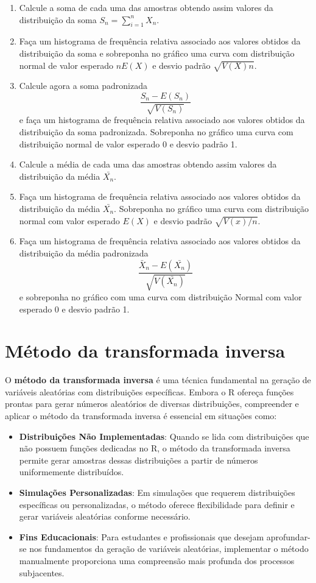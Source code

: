 \documentclass[
]{book}
\providecommand{\tightlist}{%
  \setlength{\itemsep}{0pt}\setlength{\parskip}{0pt}}
\begin{document}
\begin{enumerate}
\def\labelenumi{(\alph{enumi})}
\item
  Calcule a soma de cada uma das amostras obtendo assim valores da
  distribuição da soma \(S_{n} = \sum_{i=1}^{n}X_{n}\).
\item
  Faça um histograma de frequência relativa associado aos valores
  obtidos da distribuição da soma e sobreponha no gráfico uma curva com
  distribuição normal de valor esperado \(nE(X)\) e desvio padrão
  \(\sqrt{V(X)n}\).
\item
  Calcule agora a soma padronizada
  \[\frac{S_{n}-E(S_{n})}{\sqrt{V(S_{n})}}\] e faça um histograma de
  frequência relativa associado aos valores obtidos da distribuição da
  soma padronizada. Sobreponha no gráfico uma curva com distribuição
  normal de valor esperado 0 e desvio padrão 1.
\item
  Calcule a média de cada uma das amostras obtendo assim valores
  da distribuição da média \(\bar{X_{n}}\).
\item
  Faça um histograma de frequência relativa associado aos valores
  obtidos da distribuição da média \(\bar{X_{n}}\). Sobreponha no gráfico
  uma curva com distribuição normal com valor esperado \(E(X)\) e desvio
  padrão \(\sqrt{V(x)/n}\).
\item
  Faça um histograma de frequência relativa associado aos valores
  obtidos da distribuição da média padronizada
  \[\frac{\bar{X}_{n}-E(\bar{X_{n}})}{\sqrt{V(\bar{X_{n}})}}\] e
  sobreponha no gráfico com uma curva com distribuição Normal com valor
  esperado 0 e desvio padrão 1.
\end{enumerate}

\chapter{Método da transformada inversa}\label{muxe9todo-da-transformada-inversa}

O \textbf{método da transformada inversa} é uma técnica fundamental na geração de variáveis aleatórias com distribuições específicas. Embora o R ofereça funções prontas para gerar números aleatórios de diversas distribuições, compreender e aplicar o método da transformada inversa é essencial em situações como:

\begin{itemize}
\tightlist
\item
  \textbf{Distribuições Não Implementadas}: Quando se lida com distribuições que não possuem funções dedicadas no R, o método da transformada inversa permite gerar amostras dessas distribuições a partir de números uniformemente distribuídos.
\item
  \textbf{Simulações Personalizadas}: Em simulações que requerem distribuições específicas ou personalizadas, o método oferece flexibilidade para definir e gerar variáveis aleatórias conforme necessário.
\item
  \textbf{Fins Educacionais}: Para estudantes e profissionais que desejam aprofundar-se nos fundamentos da geração de variáveis aleatórias, implementar o método manualmente proporciona uma compreensão mais profunda dos processos subjacentes.
\end{itemize}
\end{document}
